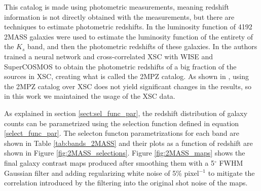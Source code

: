 \documentclass[openany,a4paper,12pt,oneside]{book}
\begin{document}
\begin{spacing}{1.5}
This catalog is made using photometric measurements, meaning redshift information is not directly obtained with the measurements, but there are techniques to estimate photometric redshifts. In \cite{K20_lum_func} the luminosity function of 4192 2MASS galaxies were used to estimate the luminosity function of the entirety of the $K_s$ band, and then the photometric redshifts of these galaxies. In \cite{2MPZ} the authors trained a neural network and cross-correlated XSC with WISE\cite{WISE} and SuperCOSMOS\cite{SuperCOSMOS} to obtain the photometric redshifts of a big fraction of the sources in XSC, creating what is called the 2MPZ catalog. As shown in \cite{Moura-Santos_2016}, using the 2MPZ catalog over XSC does not yield significant changes in the results, so in this work we maintained the usage of the XSC data.

As explained in section \ref{sect:sel_func_par}, the redshift distribution of galaxy counts can be parametrized using the selection function defined in equation \eqref{select_func_par}. The selecton functon parametrizations for each band are shown in Table \ref{tab:bands_2MASS} and their plots as a function of redshift are shown in Figure \ref{fig:2MASS_selections}. Figure \ref{fig:2MASS_maps} shows the final galaxy contrast maps produced after smoothing them with a 5$^\circ$ FWHM Gaussian filter and adding regularizing white noise of 5\% pixel$^{-1}$ to mitigate the correlation introduced by the filtering into the original shot noise of the maps.


\end{spacing}
\end{document}

